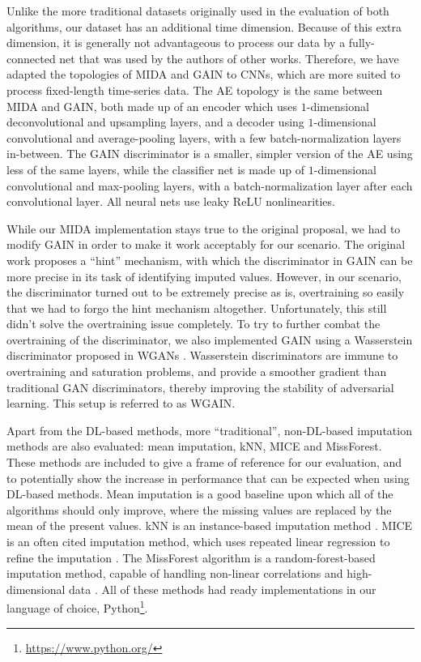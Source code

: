 				Unlike the more traditional datasets originally used in the evaluation of both algorithms, our dataset has an additional time dimension. 
				Because of this extra dimension, it is generally not advantageous to process our data by a fully-connected net that was used by the authors of other works.
				Therefore, we have adapted the topologies of \ac{MIDA} and \ac{GAIN} to \acp{CNN}, which are more suited to process fixed-length time-series data.
				The \ac{AE} topology is the same between \ac{MIDA} and \ac{GAIN}, both made up of an encoder which uses $1$-dimensional deconvolutional and upsampling layers, and a decoder using $1$-dimensional convolutional and average-pooling layers, with a few batch-normalization layers in-between.
				The \ac{GAIN} discriminator is a smaller, simpler version of the \ac{AE} using less of the same layers, while the classifier net is made up of $1$-dimensional convolutional and max-pooling layers, with a batch-normalization layer after each convolutional layer.			
				All neural nets use leaky \ac{ReLU} nonlinearities.
				
				While our \ac{MIDA} implementation stays true to the original proposal, we had to modify \ac{GAIN} in order to make it work acceptably for our scenario.
				The original work proposes a ``hint'' mechanism, with which the discriminator in \ac{GAIN} can be more precise in its task of identifying imputed values.
				However, in our scenario, the discriminator turned out to be extremely precise as is, overtraining so easily that we had to forgo the hint mechanism altogether.
				Unfortunately, this still didn't solve the overtraining issue completely.
				To try to further combat the overtraining of the discriminator, we also implemented \ac{GAIN} using a Wasserstein discriminator proposed in \acp{WGAN} \cite{wgan}.
				Wasserstein discriminators are immune to overtraining and saturation problems, and provide a smoother gradient than traditional \ac{GAN} discriminators, thereby improving the stability of adversarial learning.
				This setup is referred to as \ac{WGAIN}.
				
				
				Apart from the \ac{DL}-based methods, more ``traditional'', non-\ac{DL}-based imputation methods are also evaluated: mean imputation, \ac{kNN}, \ac{MICE} and MissForest.
				These methods are included to give a frame of reference for our evaluation, and to potentially show the increase in performance that can be expected when using \ac{DL}-based methods.
				Mean imputation is a good baseline upon which all of the algorithms should only improve, where the missing values are replaced by the mean of the present values.
				\ac{kNN} is an instance-based imputation method \cite{knn}.
				\ac{MICE} is an often cited imputation method, which uses repeated linear regression to refine the imputation \cite{mice}.
				The MissForest algorithm is a random-forest-based imputation method, capable of handling non-linear correlations and high-dimensional data \cite{missforest}.
				All of these methods had ready implementations in our language of choice, Python\footnote{\url{https://www.python.org/}}.

